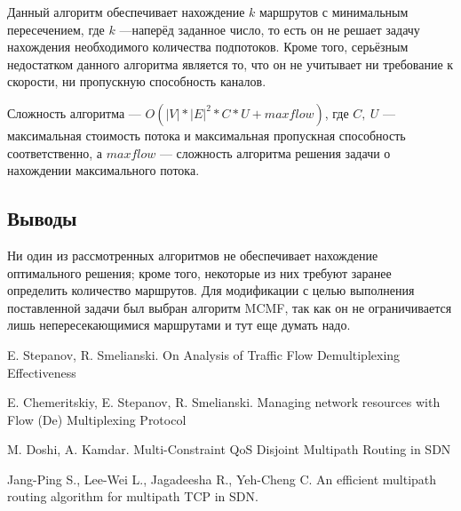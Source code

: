 \documentclass[a4paper]{article}
\begin{document}
Данный алгоритм обеспечивает нахождение $k$ маршрутов с минимальным пересечением, где $k$ ---наперёд заданное число, то есть он не решает задачу нахождения необходимого количества подпотоков. Кроме того, серьёзным недостатком данного алгоритма является то, что он не учитывает ни требование к скорости, ни пропускную способность каналов.

Сложность алгоритма --- $O(|V|*|E|^2 *C *U + maxflow)$, где $C,\ U$ --- максимальная стоимость потока и максимальная пропускная способность соответственно, а $maxflow$ --- сложность алгоритма решения задачи о нахождении максимального потока.

\subsection{Выводы}
Ни один из рассмотренных алгоритмов не обеспечивает нахождение оптимального решения; кроме того, некоторые из них требуют заранее определить количество маршрутов. Для модификации с целью выполнения поставленной задачи был выбран алгоритм MCMF, так как он не ограничивается лишь непересекающимися маршрутами и тут еще думать надо.




\begin{thebibliography}{3}
E. Stepanov, R. Smelianski. On Analysis of Traffic Flow Demultiplexing Effectiveness

E. Chemeritskiy, E. Stepanov, R. Smelianski. Managing network resources with Flow (De) Multiplexing Protocol

M. Doshi, A. Kamdar. Multi-Constraint QoS Disjoint Multipath Routing in SDN

Jang-Ping S., Lee-Wei L., Jagadeesha R., Yeh-Cheng C. An efficient multipath routing algorithm for multipath TCP in SDN.
\end{thebibliography}
\end{document}
